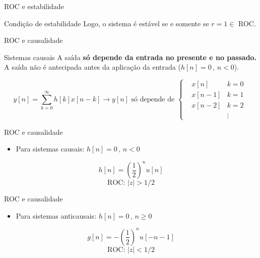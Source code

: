 \begin{frame}{ROC e estabilidade}
\begin{block}{Condição de estabilidade}
	Logo, o sistema é estável se e somente se $ r=1\in $ ROC.
\end{block}

\centering

\scalebox{1.5}{}

\end{frame}


\begin{frame}{ROC e causalidade}
\begin{block}{Sistemas causais}
	A saída \textbf{só depende da entrada no presente e no passado.} A saída não é antecipada antes da aplicação da entrada ($ h[n]=0\, , \, n<0 $).
	
	$$ y[n]=\sum_{k=0}^{\infty}h[k]x[n-k] \rightarrow y[n] \text{ só depende de } \left\lbrace \begin{aligned}&x[n] \quad &k=0\\
	&x[n-1] &k=1\\
	&x[n-2] &k=2\\
	& &\vdots\phantom{k=n}
	\end{aligned}\right.  $$
\end{block}
\end{frame}

\begin{frame}{ROC e causalidade}
\begin{block}{}
\begin{itemize}
	\item Para sistemas causais: $ h[n]=0 \, , \, n<0 $
\end{itemize}
\end{block}

\begin{minipage}{0.45\linewidth}
	\centering
	\scalebox{1}{}
\end{minipage}
\hfill
\begin{minipage}{0.45\linewidth}
	\centering
	\[ h[n]=\left( \dfrac{1}{2} \right)^{n}u[n]  \]
	\[ \text{ROC: } |z|>1/2\]
	\scalebox{1}{}
\end{minipage}
\end{frame}


\begin{frame}{ROC e causalidade}
\begin{block}{}
	\begin{itemize}
		\item Para sistemas anticausais: $ h[n]=0 \, , \, n\geqslant0 $
	\end{itemize}
\end{block}
\begin{minipage}{0.45\linewidth}
	\centering
	\scalebox{1}{}
\end{minipage}
\hfill
\begin{minipage}{0.45\linewidth}
	\centering
	\[ g[n]=-\left( \dfrac{1}{2} \right)^{n}u[-n-1]  \]
	\[ \text{ROC: } |z|<1/2\]
	\scalebox{1}{}
\end{minipage}

\end{frame}



